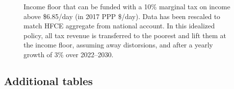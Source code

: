 \FloatBarrier
\begin{figure}[!htb]
  \caption[Income floor of 10\% tax above \$6.85/day after 3\% growth (HFCE-scaled).]{Income floor that can be funded with a 10\% marginal tax on income above \$6.85/day (in 2017 PPP \$/day). Data has been rescaled to match HFCE aggregate from national account. In this idealized policy, all tax revenue is transferred to the poorest and lift them at the income floor, assuming away distorsions, and after a yearly growth of 3\% over 2022--2030. 
  }\label{fig:s_demogrant_7__10}
\end{figure}

\subsection{Additional tables}










